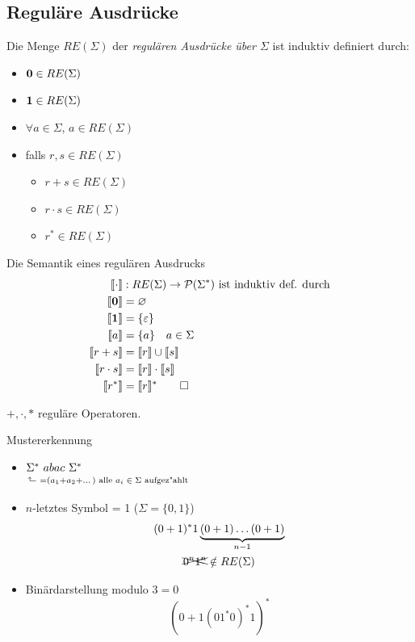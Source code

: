 \subsection{Reguläre Ausdrücke}
\begin{Def}[name={[RE($\Sigma$)]}]
	Die Menge $RE(\Sigma)$ der \emph{regulären Ausdrücke über $\Sigma$} ist induktiv definiert durch:
	\begin{itemize}
	\item $\mathbf{0}\in RE(\Sigma)$
	\item $\mathbf{1}\in RE(\Sigma)$
	\item $\forall a\in\Sigma$, $a\in RE(\Sigma)$
	\item falls $r,s\in RE(\Sigma)$
		\begin{itemize}[label=\textbullet]
		\item $r+s\in RE(\Sigma)$
		\item $r\cdot s\in RE(\Sigma)$
		\item $r^*\in RE(\Sigma)$
		\end{itemize}
	\end{itemize}
\end{Def}
\begin{Def}[name={[Semantik eines regulären Ausdrucks]}]
	Die Semantik eines regulären Ausdrucks
	\begin{align*}
		\llbracket\cdot \rrbracket &: RE(\Sigma) \-> \mathcal{P}(\Sigma^*)\text{ ist induktiv def. durch}\\
		\llbracket \0 \rrbracket &= \varnothing\\
		\llbracket \1 \rrbracket &= \{\Eps\}\\
		\llbracket a \rrbracket &= \{a\} \quad a\in\Sigma\\
		\llbracket r+s \rrbracket &= \llbracket r\rrbracket \cup \llbracket s\rrbracket\\
		\llbracket r\cdot s \rrbracket &= \llbracket r\rrbracket \cdot \llbracket s\rrbracket\\
		\llbracket r^* \rrbracket &= \llbracket r\rrbracket^* \qedhere
	\end{align*}
\end{Def}
$+,\cdot ,*$ reguläre Operatoren.\\
%
\begin{minipage}[t]{.5\textwidth}
    \begin{Bsp*} Mustererkennung
    	\begin{itemize}
    	\item $\underset{\vphantom{\big(}\mathrlap{\hspace{-4pt}\rotatebox[origin=c]{90}{$\Rsh$}\ =(a_1+a_2+\dots) \text{ alle $a_i\in\Sigma$ aufgez"ahlt}}}{\Sigma^*}\ abac\ \Sigma^*$
    	\item $n$-letztes Symbol = 1 ($\Sigma=\{0,1\}$)
    	\begin{gather*}
    	(0+1)^*1\underbrace{(0+1)\dots(0+1)}_{n-1}\\
    	\xcancel{0^n1^n}\notin RE(\Sigma)
    	\end{gather*}
    	\item Binärdarstellung modulo $3=0$
    	\[ (0+1(01^*0)^*1)^* \]
    	\end{itemize}
    \end{Bsp*}
\end{minipage}%
